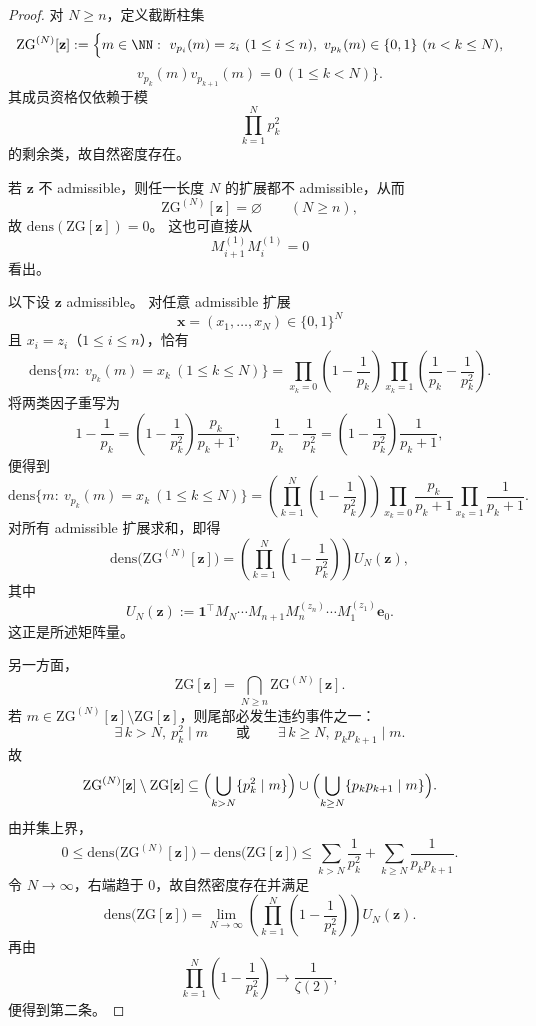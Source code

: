 \begin{proof}
对 \(N\ge n\)，定义截断柱集
\[
\mathrm{ZG}^{(N)}[\mathbf z]
:=
\Bigl\{
m\in\NN:\ 
v_{p_i}(m)=z_i\ (1\le i\le n),\
v_{p_k}(m)\in\{0,1\}\ (n<k\le N),
\]
\[
v_{p_k}(m)v_{p_{k+1}}(m)=0\ (1\le k<N)
\Bigr\}.
\]
其成员资格仅依赖于模
\[
\prod_{k=1}^{N}p_k^2
\]
的剩余类，故自然密度存在。

若 \(\mathbf z\) 不 admissible，则任一长度 \(N\) 的扩展都不 admissible，从而
\[
\mathrm{ZG}^{(N)}[\mathbf z]=\varnothing
\qquad(N\ge n),
\]
故 \(\mathrm{dens}(\mathrm{ZG}[\mathbf z])=0\)。
这也可直接从
\[
M_{i+1}^{(1)}M_i^{(1)}=0
\]
看出。

以下设 \(\mathbf z\) admissible。
对任意 admissible 扩展
\[
\mathbf x=(x_1,\dots,x_N)\in\{0,1\}^N
\]
且 \(x_i=z_i\)（\(1\le i\le n\)），恰有
\[
\mathrm{dens}\bigl\{m:\ v_{p_k}(m)=x_k\ (1\le k\le N)\bigr\}
=
\prod_{x_k=0}\left(1-\frac1{p_k}\right)
\prod_{x_k=1}\left(\frac1{p_k}-\frac1{p_k^2}\right).
\]
将两类因子重写为
\[
1-\frac1{p_k}
=
\left(1-\frac1{p_k^2}\right)\frac{p_k}{p_k+1},
\qquad
\frac1{p_k}-\frac1{p_k^2}
=
\left(1-\frac1{p_k^2}\right)\frac1{p_k+1},
\]
便得到
\[
\mathrm{dens}\bigl\{m:\ v_{p_k}(m)=x_k\ (1\le k\le N)\bigr\}
=
\left(\prod_{k=1}^{N}\left(1-\frac1{p_k^2}\right)\right)
\prod_{x_k=0}\frac{p_k}{p_k+1}
\prod_{x_k=1}\frac1{p_k+1}.
\]
对所有 admissible 扩展求和，即得
\[
\mathrm{dens}\bigl(\mathrm{ZG}^{(N)}[\mathbf z]\bigr)
=
\left(\prod_{k=1}^{N}\left(1-\frac1{p_k^2}\right)\right)
U_N(\mathbf z),
\]
其中
\[
U_N(\mathbf z)
:=
\mathbf 1^\top
M_N\cdots M_{n+1}
M_n^{(z_n)}\cdots M_1^{(z_1)}\mathbf e_0.
\]
这正是所述矩阵量。

另一方面，
\[
\mathrm{ZG}[\mathbf z]=\bigcap_{N\ge n}\mathrm{ZG}^{(N)}[\mathbf z].
\]
若 \(m\in \mathrm{ZG}^{(N)}[\mathbf z]\setminus \mathrm{ZG}[\mathbf z]\)，则尾部必发生违约事件之一：
\[
\exists\,k>N,\ p_k^2\mid m
\qquad\text{或}\qquad
\exists\,k\ge N,\ p_kp_{k+1}\mid m.
\]
故
\[
\mathrm{ZG}^{(N)}[\mathbf z]\setminus \mathrm{ZG}[\mathbf z]
\subseteq
\Bigl(\bigcup_{k>N}\{p_k^2\mid m\}\Bigr)
\cup
\Bigl(\bigcup_{k\ge N}\{p_kp_{k+1}\mid m\}\Bigr).
\]
由并集上界，
\[
0\le
\mathrm{dens}\bigl(\mathrm{ZG}^{(N)}[\mathbf z]\bigr)
-\mathrm{dens}\bigl(\mathrm{ZG}[\mathbf z]\bigr)
\le
\sum_{k>N}\frac1{p_k^2}
+
\sum_{k\ge N}\frac1{p_kp_{k+1}}.
\]
令 \(N\to\infty\)，右端趋于 \(0\)，故自然密度存在并满足
\[
\mathrm{dens}\bigl(\mathrm{ZG}[\mathbf z]\bigr)
=
\lim_{N\to\infty}
\left(\prod_{k=1}^{N}\left(1-\frac1{p_k^2}\right)\right)U_N(\mathbf z).
\]
再由
\[
\prod_{k=1}^{N}\left(1-\frac1{p_k^2}\right)\longrightarrow \frac1{\zeta(2)},
\]
便得到第二条。


\end{proof}
